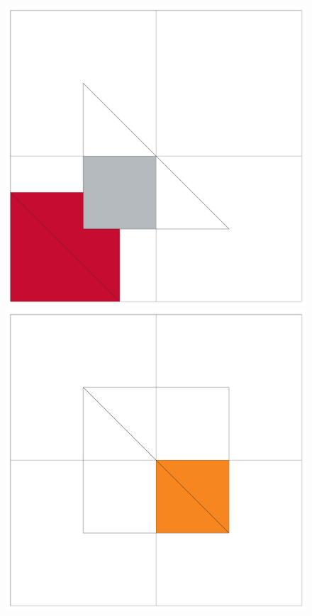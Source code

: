 \begin{figure}[!htb]
  \includegraphics[width=\linewidth]{drawings/examples/cube_example/cubes_05.pdf}
\endminipage\hfill
{}
  \includegraphics[width=\linewidth]{drawings/examples/cube_example/cubes_02.pdf}
  

\end{figure}
